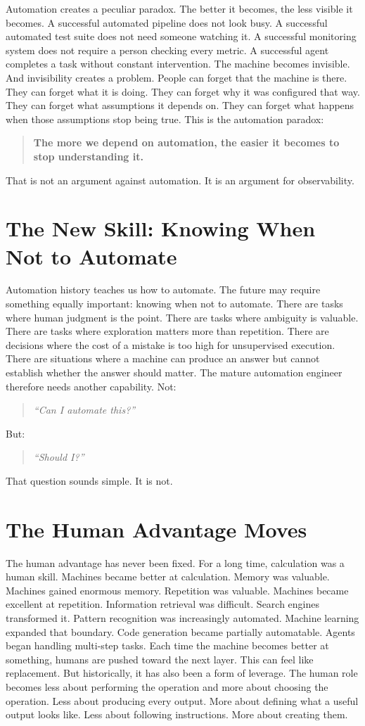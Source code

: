 \documentclass[11pt,twoside]{book}
\begin{document}
Automation creates a peculiar paradox.
The better it becomes, the less visible it becomes.
A successful automated pipeline does not look busy.
A successful automated test suite does not need someone watching it.
A successful monitoring system does not require a person checking every metric.
A successful agent completes a task without constant intervention.
The machine becomes invisible.
And invisibility creates a problem.
People can forget that the machine is there.
They can forget what it is doing.
They can forget why it was configured that way.
They can forget what assumptions it depends on.
They can forget what happens when those assumptions stop being true.
This is the automation paradox:
\begin{quote}
\textbf{The more we depend on automation, the easier it becomes to stop understanding it.}
\end{quote}
That is not an argument against automation.
It is an argument for observability.

\section*{The New Skill: Knowing When Not to Automate}

Automation history teaches us how to automate.
The future may require something equally important:
knowing when not to automate.
There are tasks where human judgment is the point.
There are tasks where ambiguity is valuable.
There are tasks where exploration matters more than repetition.
There are decisions where the cost of a mistake is too high for unsupervised execution.
There are situations where a machine can produce an answer but cannot establish whether the answer should matter.
The mature automation engineer therefore needs another capability.
Not:
\begin{quote}
\emph{``Can I automate this?''}
\end{quote}
But:
\begin{quote}
\emph{``Should I?''}
\end{quote}
That question sounds simple.
It is not.

\section*{The Human Advantage Moves}

The human advantage has never been fixed.
For a long time, calculation was a human skill.
Machines became better at calculation.
Memory was valuable.
Machines gained enormous memory.
Repetition was valuable.
Machines became excellent at repetition.
Information retrieval was difficult.
Search engines transformed it.
Pattern recognition was increasingly automated.
Machine learning expanded that boundary.
Code generation became partially automatable.
Agents began handling multi-step tasks.
Each time the machine becomes better at something, humans are pushed toward the next layer.
This can feel like replacement.
But historically, it has also been a form of leverage.
The human role becomes less about performing the operation and more about choosing the operation.
Less about producing every output.
More about defining what a useful output looks like.
Less about following instructions.
More about creating them.
\end{document}
